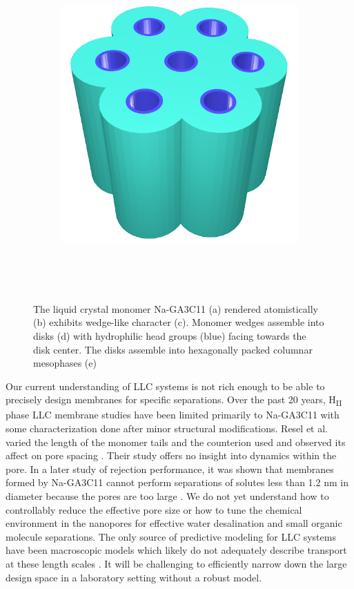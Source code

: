 \documentclass{article}
\begin{document}
\begin{figure}
\begin{subfigure}{0.4\linewidth}
		\centering
		\includegraphics[width=\textwidth]{hexagonal_packing.png}
		\caption{}~\label{fig:hex_packing_simple}
	\end{subfigure}
	\caption{The liquid crystal monomer Na-GA3C11 (a) rendered atomistically (b)
	exhibits wedge-like character (c). Monomer wedges assemble into disks (d) with
	hydrophilic head groups (blue) facing towards the disk center. The disks
	assemble into hexagonally packed columnar mesophases (e)}~\label{fig:assembly}
  \end{figure}

  Our current understanding of LLC systems is not rich enough to be able to
  precisely design membranes for specific separations. Over the past 20 years,
  H\textsubscript{II} phase LLC membrane studies have been limited primarily to
  Na-GA3C11 with some characterization done after minor structural modifications.
  Resel et al. varied the length of the monomer tails and the counterion used and
  observed its affect on pore spacing \cite{resel_structural_2000}.  Their study
  offers no insight into dynamics within the pore. In a later study of rejection
  performance, it was shown that membranes formed by Na-GA3C11 cannot perform
  separations of solutes less than 1.2 nm in diameter because the pores are too
  large \cite{zhou_supported_2005}.  We do not yet understand how to controllably
  reduce the effective pore size or how to tune the chemical environment in the
  nanopores for effective water desalination and small organic molecule
  separations. The only source of predictive modeling for LLC systems have been
  macroscopic models which likely do not adequately describe transport at these
  length scales \cite{hatakeyama_water_2011}. It will be challenging to
  efficiently narrow down the large design space in a laboratory setting without
  a robust model.
\end{document}
